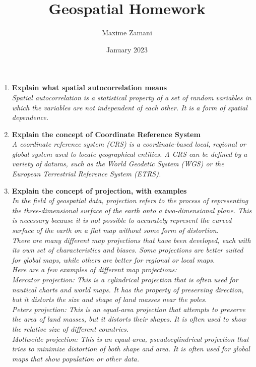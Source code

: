 \documentclass{article}
\author{Maxime Zamani}
\title{Geospatial Homework}
\date{January 2023}
\begin{document}
\maketitle

\begin{enumerate}
    \item \textbf{Explain what spatial autocorrelation means} \\
    \textit{Spatial autocorrelation is a statistical property of a set of random variables in which the variables are not independent of each other. It is a form of spatial dependence.}
    \item \textbf{Explain the concept of Coordinate Reference System} \\
    \textit{A coordinate reference system (CRS) is a coordinate-based local, regional or global system used to locate geographical entities. A CRS can be defined by a variety of datums, such as the World Geodetic System (WGS) or the European Terrestrial Reference System (ETRS).}
    \item \textbf{Explain the concept of projection, with examples} \\
    \textit{In the field of geospatial data, projection refers to the process of representing the three-dimensional surface of the earth onto a two-dimensional plane. This is necessary because it is not possible to accurately represent the curved surface of the earth on a flat map without some form of distortion.\\There are many different map projections that have been developed, each with its own set of characteristics and biases. Some projections are better suited for global maps, while others are better for regional or local maps.\\Here are a few examples of different map projections:\\Mercator projection: This is a cylindrical projection that is often used for nautical charts and world maps. It has the property of preserving direction, but it distorts the size and shape of land masses near the poles.\\
    Peters projection: This is an equal-area projection that attempts to preserve the area of land masses, but it distorts their shapes. It is often used to show the relative size of different countries.\\
    Mollweide projection: This is an equal-area, pseudocylindrical projection that tries to minimize distortion of both shape and area. It is often used for global maps that show population or other data.}

\end{enumerate}
\end{document}
